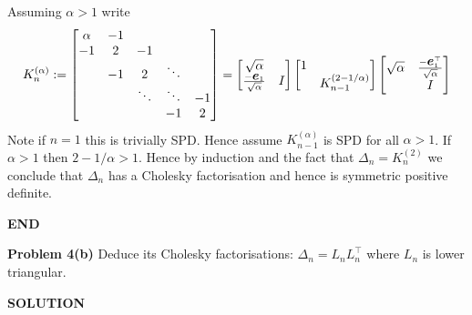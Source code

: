 \documentclass[12pt,a4paper]{article}
\def\e{ {\vc e} }
\begin{document}
Assuming $\ensuremath{\alpha} > 1$ write
\[
K_n^{(\ensuremath{\alpha})} := \begin{bmatrix}
\ensuremath{\alpha} & -1 \\
-1 & 2 & -1 \\
& -1 & 2 & \ensuremath{\ddots} \\
&& \ensuremath{\ddots} & \ensuremath{\ddots} & -1 \\
&&& -1 & 2
\end{bmatrix} =
                    \begin{bmatrix} \sqrt{\ensuremath{\alpha}} \\
                                    {-\ensuremath{\bm{\e}}_1 \over \sqrt{\ensuremath{\alpha}}} & I
                                        \end{bmatrix}
                    \begin{bmatrix}1 \\ & K_{n-1}^{(2 - 1/\ensuremath{\alpha})} \end{bmatrix}
                    \begin{bmatrix} \sqrt{\ensuremath{\alpha}} & {-\ensuremath{\bm{\e}}_1^\ensuremath{\top} \over \sqrt{\ensuremath{\alpha}}} \\
                                                            & I
                                        \end{bmatrix}
\]
Note if $n = 1$ this is trivially SPD. Hence assume $K_{n-1}^{(\ensuremath{\alpha})}$ is SPD for all $\ensuremath{\alpha} > 1$. If $\ensuremath{\alpha} > 1$ then $2 - 1/\ensuremath{\alpha} > 1$. Hence by induction and the fact that $\ensuremath{\Delta}_n = K_n^{(2)}$ we conclude that $\ensuremath{\Delta}_n$ has a Cholesky factorisation and hence is symmetric positive definite.

\textbf{END}

\textbf{Problem 4(b)} Deduce its Cholesky factorisations: $\ensuremath{\Delta}_n = L_n L_n^\ensuremath{\top}$ where $L_n$ is lower triangular.

\textbf{SOLUTION}
\end{document}
